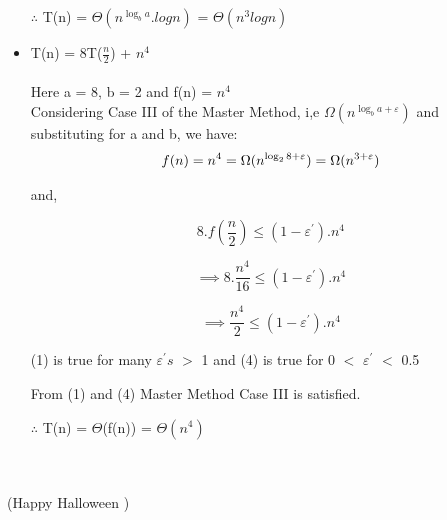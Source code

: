 \documentclass{article}
\begin{document}
\begin{itemize}
  $\therefore$ T(n) = $\Theta(n^{\log_b {a}}.log n)$ = $\Theta(n^{3} log n)$
  


  
\item T(n) = 8T($\frac{n}{2}$) + $n^{4}$ \\ \\

  Here a = 8, b = 2 and f(n) = $n^{4}$ \\
  Considering Case III of the Master Method, i,e $\Omega(n^{\log_b {a} + \varepsilon})$ and substituting for a and b, we have: \\

  \begin{equation}
    f(n) = n^{4} = \Omega(n^{\log_2 {8} + \varepsilon}) =  \Omega(n^{3 + \varepsilon})   \\
  \end{equation}

  and,
  
  \begin{equation}
    8.f(\frac{n}{2}) \leq (1 - \varepsilon^{\prime}).n^{4}
   \end{equation}

  \begin{equation}
  \implies 8.\frac{n^{4}}{16} \leq (1 - \varepsilon^{\prime}).n^{4}
  \end{equation}

  \begin{equation}
  \implies \frac{n^{4}}{2} \leq (1 - \varepsilon^{\prime}).n^{4}    
  \end{equation}
  
  (1) is true for many $\varepsilon^{\prime}s$ $>$ 1
  and (4) is true for 0 $<$ $\varepsilon^{\prime}$ $<$ 0.5
  
  From (1) and (4) Master Method Case III is satisfied.

  $\therefore$ T(n) = $\Theta$(f(n)) = $\Theta(n^{4})$

\end{itemize}

\\

\\

(Happy Halloween \mathwitch)
\end{document}
